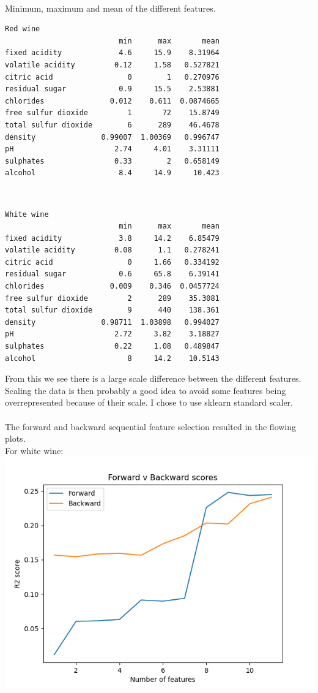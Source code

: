 \documentclass[12pt, letterpaper, twoside]{article}
\begin{document}
\ \\
Minimum, maximum and mean of the different features.\\
\begin{verbatim}
Red wine
                          min      max       mean
fixed acidity             4.6     15.9    8.31964
volatile acidity         0.12     1.58   0.527821
citric acid                 0        1   0.270976
residual sugar            0.9     15.5    2.53881
chlorides               0.012    0.611  0.0874665
free sulfur dioxide         1       72    15.8749
total sulfur dioxide        6      289    46.4678
density               0.99007  1.00369   0.996747
pH                       2.74     4.01    3.31111
sulphates                0.33        2   0.658149
alcohol                   8.4     14.9     10.423
\end{verbatim}
\newpage
\ \\
\begin{verbatim}
White wine
                          min      max       mean
fixed acidity             3.8     14.2    6.85479
volatile acidity         0.08      1.1   0.278241
citric acid                 0     1.66   0.334192
residual sugar            0.6     65.8    6.39141
chlorides               0.009    0.346  0.0457724
free sulfur dioxide         2      289    35.3081
total sulfur dioxide        9      440    138.361
density               0.98711  1.03898   0.994027
pH                       2.72     3.82    3.18827
sulphates                0.22     1.08   0.489847
alcohol                     8     14.2    10.5143
\end{verbatim}
From this we see there is a large scale difference between the different features. Scaling the data is then probably a good idea to avoid some features being overrepresented because of their scale. I chose to use sklearn standard scaler.\\
\newpage
\ \\
The forward and backward sequential feature selection resulted in the flowing plots.\\
For white wine:\\
\includegraphics[scale=0.75]{"forward_v_backward_white"}\\
\end{document}
